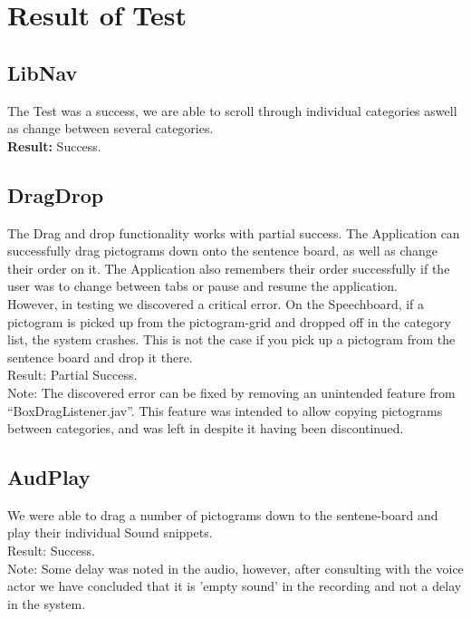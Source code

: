 \section{Result of Test}
\subsection*{LibNav}
The Test was a success, we are able to scroll through individual categories aswell as change between several categories.\\

\textbf{Result:} Success.

\subsection*{DragDrop}
The Drag and drop functionality works with partial success.
The Application can successfully drag pictograms down onto the sentence board, as well as change their order on it.
The Application also remembers their order successfully if the user was to change between tabs or pause and resume the application.\\

However, in testing we discovered a critical error. On the Speechboard, if a pictogram is picked up from the pictogram-grid and dropped off in the category list, the system crashes.
This is not the case if you pick up a pictogram from the sentence board and drop it there.\\

Result: Partial Success.\\

Note: The discovered error can be fixed by removing an unintended feature from ``BoxDragListener.jav''. This feature was intended to allow copying pictograms between categories, and was left in despite it having been discontinued. 

\subsection*{AudPlay}
We were able to drag a number of pictograms down to the sentene-board and play their individual Sound snippets.\\

Result: Success.\\

Note: Some delay was noted in the audio, however, after consulting with the voice actor we have concluded that it is 'empty sound' in the recording and not a delay in the system.

